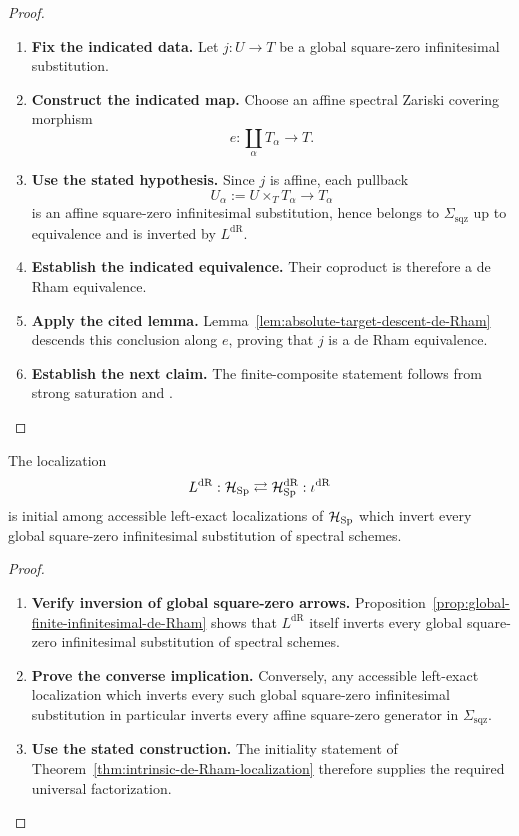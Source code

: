 \begin{proof}
\leavevmode
\begin{enumerate}[label=\textup{(\arabic*)}]
    \item \textbf{Fix the indicated data.}
    Let \(j:U\to T\) be a global square-zero infinitesimal substitution.
    \item \textbf{Construct the indicated map.}
    Choose an affine spectral Zariski covering morphism
    \[
    e:\coprod_\alpha T_\alpha\longrightarrow T.
    \]
    \item \textbf{Use the stated hypothesis.}
    Since \(j\) is affine, each pullback
    \[
    U_\alpha:=U\times_TT_\alpha\longrightarrow T_\alpha
    \]
    is an affine square-zero infinitesimal substitution, hence belongs to
    \(\Sigma_{\mathrm{sqz}}\) up to equivalence and is inverted by
    \(L^{\mathrm{dR}}\).
    \item \textbf{Establish the indicated equivalence.}
    Their coproduct is therefore a de Rham equivalence.
    \item \textbf{Apply the cited lemma.}
    Lemma~\ref{lem:absolute-target-descent-de-Rham} descends this conclusion along
    \(e\), proving that \(j\) is a de Rham equivalence.
    \item \textbf{Establish the next claim.}
    The finite-composite statement follows from strong saturation and
    .
\end{enumerate}
\end{proof}

\begin{corollary}
\label{cor:global-universal-property-de-Rham}
The localization
\[
  L^{\mathrm{dR}}:
  \mathcal H_{\operatorname{Sp}}
  \rightleftarrows
  \mathcal H_{\operatorname{Sp}}^{\mathrm{dR}}
  :\iota^{\mathrm{dR}}
\]
is initial among accessible left-exact localizations of
\(\mathcal H_{\operatorname{Sp}}\) which invert every global square-zero infinitesimal
substitution of spectral schemes.
\end{corollary}

\begin{proof}
\leavevmode
\begin{enumerate}[label=\textup{(\arabic*)}]
    \item \textbf{Verify inversion of global square-zero arrows.}
    Proposition~\ref{prop:global-finite-infinitesimal-de-Rham} shows that
    \(L^{\mathrm{dR}}\) itself inverts every global square-zero
    infinitesimal substitution of spectral schemes.
    \item \textbf{Prove the converse implication.}
    Conversely, any accessible left-exact localization which inverts every such global
    square-zero infinitesimal substitution in particular inverts every affine square-zero
    generator in \(\Sigma_{\mathrm{sqz}}\).
    \item \textbf{Use the stated construction.}
    The initiality statement of
    Theorem~\ref{thm:intrinsic-de-Rham-localization} therefore supplies the required
    universal factorization.
\end{enumerate}
\end{proof}

